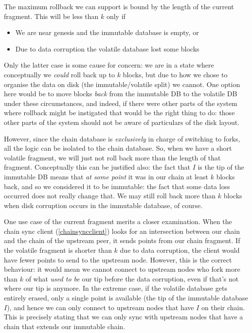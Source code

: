 The maximum rollback we can support is bound by the length of the current  fragment. This will be less than $k$ only if

\begin{itemize}
\item We are near genesis and the immutable database is empty, or
\item Due to data corruption the volatile database lost some blocks
\end{itemize}

Only the latter case is some cause for concern: we are in a state where
conceptually we \emph{could} roll back up to $k$ blocks, but due to how we chose
to organise the data on disk (the immutable/volatile split) we cannot. One
option here would be to move blocks \emph{back} from the immutable DB to the
volatile DB under these circumstances, and indeed, if there were other parts of
the system where rollback might be instigated that would be the right thing to
do: those other parts of the system should not be aware of particulars of the
disk layout.

However, since the chain database is \emph{exclusively} in charge of switching
to forks, all the logic can be isolated to the chain database. So, when we have
a short volatile fragment, we will just not roll back more than the length of
that fragment. Conceptually this can be justified also: the fact that $I$ is the
tip of the immutable DB means that \emph{at some point} it was in our chain at
least $k$ blocks back, and so we considered it to be immutable: the fact that
some data loss occurred does not really change that. We may still roll back more
than $k$ blocks when disk corruption occurs in the immutable database, of
course.

One use case of the current fragment merits a closer examination. When the chain
sync client (\cref{chainsyncclient}) looks for an intersection between our chain
and the chain of the upstream peer, it sends points from our chain fragment. If
the volatile fragment is shorter than $k$ due to data corruption, the client
would have fewer points to send to the upstream node. However, this is the
correct behaviour: it would mean we cannot connect to upstream nodes who fork
more than $k$ of what \emph{used to be} our tip before the data corruption, even
if that's not where our tip is anymore. In the extreme case, if the volatile
database gets entirely erased, only a single point is available (the tip of the
immutable database $I$), and hence we can only connect to upstream nodes that
have $I$ on their chain.  This is precisely stating that we can only sync with
upstream nodes that have a chain that extends our immutable chain.

